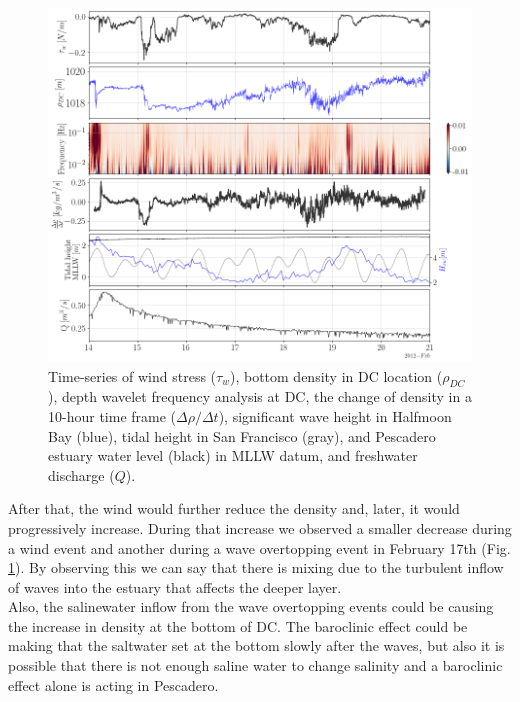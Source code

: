 \documentclass[tesis.tex]{subfiles}
\begin{document}
\begin{figure}[h!]
    \centering
    \includegraphics[width=\textwidth]{Imagenes/mix_wo.png}
    \caption{Time-series of wind stress ($\tau_w$), bottom density in DC location ($\rho_{DC}$), depth wavelet frequency analysis at DC, the change of density in a 10-hour time frame ($\Delta \rho / \Delta t$), significant wave height in Halfmoon Bay (blue), tidal height in San Francisco (gray), and Pescadero estuary water level (black) in MLLW datum, and freshwater discharge ($Q$). }
    \label{fig:mix_wo}
\end{figure}

After that, the wind would further reduce the density and, later, it would progressively increase. During that increase we observed a smaller decrease during a wind event and another during a wave overtopping event in February 17th (Fig. \ref{fig:mix_wo}). By observing this we can say that there is mixing due to the turbulent inflow of waves into the estuary that affects the deeper layer.\\ 

Also, the salinewater inflow from the wave overtopping events could be causing the increase in density at the bottom of DC. The baroclinic effect could be making that the saltwater set at the bottom slowly after the waves, but also it is possible that there is not enough saline water to change salinity and a baroclinic effect alone is acting in Pescadero.\\
\end{document}

